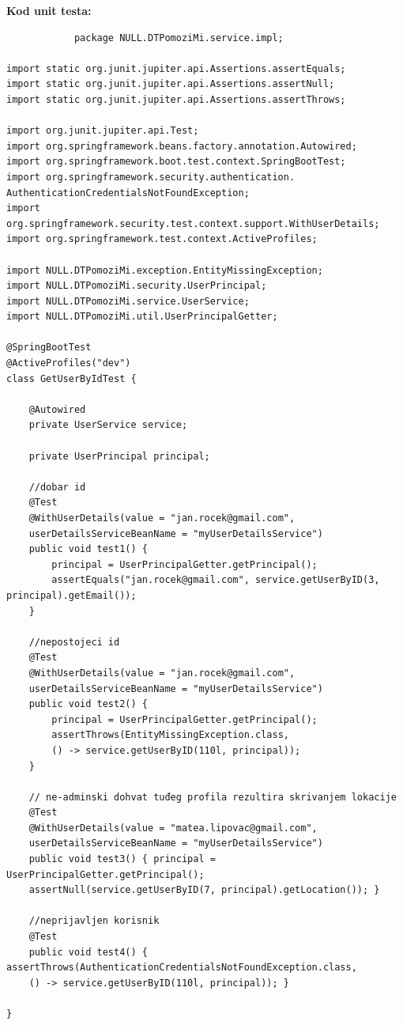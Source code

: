             \noindent \textbf{Kod unit testa: }
            \begin{verbatim}
            package NULL.DTPomoziMi.service.impl;

import static org.junit.jupiter.api.Assertions.assertEquals;
import static org.junit.jupiter.api.Assertions.assertNull;
import static org.junit.jupiter.api.Assertions.assertThrows;

import org.junit.jupiter.api.Test;
import org.springframework.beans.factory.annotation.Autowired;
import org.springframework.boot.test.context.SpringBootTest;
import org.springframework.security.authentication.
AuthenticationCredentialsNotFoundException;
import org.springframework.security.test.context.support.WithUserDetails;
import org.springframework.test.context.ActiveProfiles;

import NULL.DTPomoziMi.exception.EntityMissingException;
import NULL.DTPomoziMi.security.UserPrincipal;
import NULL.DTPomoziMi.service.UserService;
import NULL.DTPomoziMi.util.UserPrincipalGetter;

@SpringBootTest
@ActiveProfiles("dev")
class GetUserByIdTest {

	@Autowired
	private UserService service;

	private UserPrincipal principal;

	//dobar id
	@Test
	@WithUserDetails(value = "jan.rocek@gmail.com",
	userDetailsServiceBeanName = "myUserDetailsService")
	public void test1() {
		principal = UserPrincipalGetter.getPrincipal();
		assertEquals("jan.rocek@gmail.com", service.getUserByID(3, principal).getEmail());
	}

	//nepostojeci id
	@Test
	@WithUserDetails(value = "jan.rocek@gmail.com",
	userDetailsServiceBeanName = "myUserDetailsService")
	public void test2() {
		principal = UserPrincipalGetter.getPrincipal();
		assertThrows(EntityMissingException.class, 
		() -> service.getUserByID(110l, principal));
	}

	// ne-adminski dohvat tuđeg profila rezultira skrivanjem lokacije
	@Test
	@WithUserDetails(value = "matea.lipovac@gmail.com",
	userDetailsServiceBeanName = "myUserDetailsService")
	public void test3() { principal = UserPrincipalGetter.getPrincipal();
	assertNull(service.getUserByID(7, principal).getLocation()); }

	//neprijavljen korisnik
	@Test
	public void test4() { assertThrows(AuthenticationCredentialsNotFoundException.class, 
	() -> service.getUserByID(110l, principal)); }

}
            \end{verbatim}
            

